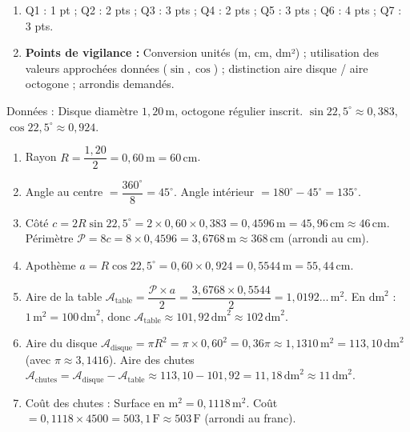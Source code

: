 \documentclass[11pt]{article}
\begin{document}
\begin{corrige}
\begin{aretenir}
\begin{enumerate}
\item Q1 : 1 pt ; Q2 : 2 pts ; Q3 : 3 pts ; Q4 : 2 pts ; Q5 : 3 pts ; Q6 : 4 pts ; Q7 : 3 pts.
\item \textbf{Points de vigilance :} Conversion unités (m, cm, dm²) ; utilisation des valeurs approchées données ($\sin, \cos$) ; distinction aire disque / aire octogone ; arrondis demandés.
\end{enumerate}
\end{aretenir}

Données : Disque diamètre $1,20\,\text{m}$, octogone régulier inscrit. $\sin 22,5^{\circ}\approx 0,383$, $\cos 22,5^{\circ}\approx 0,924$.
\begin{enumerate}
\item Rayon $R = \dfrac{1,20}{2} = 0,60\,\text{m} = 60\,\text{cm}$.
\item Angle au centre $= \dfrac{360^{\circ}}{8} = 45^{\circ}$.
Angle intérieur $= 180^{\circ} - 45^{\circ} = 135^{\circ}$.
\item Côté $c = 2R\sin 22,5^{\circ} = 2\times 0,60 \times 0,383 = 0,4596\,\text{m} = 45,96\,\text{cm} \approx \boxed{46\,\text{cm}}$.
Périmètre $\mathcal{P} = 8c = 8 \times 0,4596 = 3,6768\,\text{m} \approx \boxed{368\,\text{cm}}$ (arrondi au cm).
\item Apothème $a = R\cos 22,5^{\circ} = 0,60 \times 0,924 = 0,5544\,\text{m} = \boxed{55,44\,\text{cm}}$.
\item Aire de la table $\mathcal{A}_{\text{table}} = \dfrac{\mathcal{P}\times a}{2} = \dfrac{3,6768 \times 0,5544}{2} = 1,0192\ldots\,\text{m}^2$.
En $\text{dm}^2$ : $1\,\text{m}^2 = 100\,\text{dm}^2$, donc $\mathcal{A}_{\text{table}} \approx 101,92\,\text{dm}^2 \approx \boxed{102\,\text{dm}^2}$.
\item Aire du disque $\mathcal{A}_{\text{disque}} = \pi R^2 = \pi \times 0,60^2 = 0,36\pi \approx 1,1310\,\text{m}^2 = 113,10\,\text{dm}^2$ (avec $\pi\approx 3,1416$).
Aire des chutes $\mathcal{A}_{\text{chutes}} = \mathcal{A}_{\text{disque}} - \mathcal{A}_{\text{table}} \approx 113,10 - 101,92 = 11,18\,\text{dm}^2 \approx \boxed{11\,\text{dm}^2}$.
\item Coût des chutes : Surface en $\text{m}^2 = 0,1118\,\text{m}^2$.
Coût $= 0,1118 \times 4500 = 503,1\,\text{F} \approx \boxed{503\,\text{F}}$ (arrondi au franc).
\end{enumerate}
\end{corrige}
\end{document}
